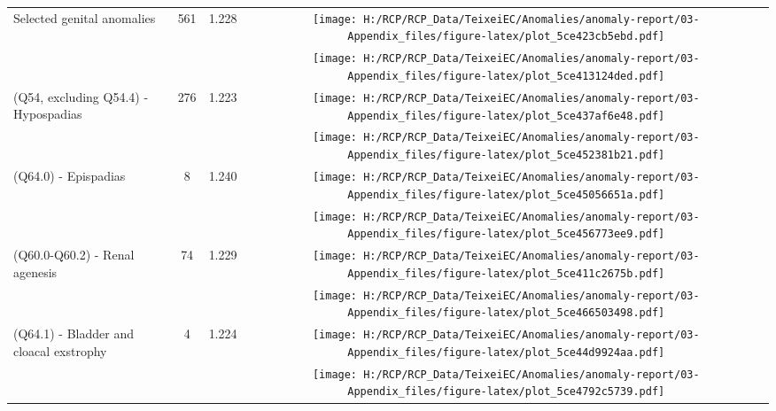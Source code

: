 \documentclass[
]{krantz}
\begin{document}
\begin{longtable}[t]{>{\raggedright\arraybackslash}m{4cm}cc>{}c}
Selected genital anomalies & 561 & 1.228 & \texttt{[image: H:/RCP/RCP\_Data/TeixeiEC/Anomalies/anomaly-report/03-Appendix\_files/figure-latex/plot\_5ce423cb5ebd.pdf]}\\
\addlinespace
\cellcolor{gray!6}{(Q53.1, Q53.2, Q53.9) - Cryptorchidism / undescended testicles} & \cellcolor{gray!6}{262} & \cellcolor{gray!6}{1.232} & \cellcolor{gray!6}{}\texttt{[image: H:/RCP/RCP\_Data/TeixeiEC/Anomalies/anomaly-report/03-Appendix\_files/figure-latex/plot\_5ce413124ded.pdf]}\\
(Q54, excluding Q54.4) - Hypospadias & 276 & 1.223 & \texttt{[image: H:/RCP/RCP\_Data/TeixeiEC/Anomalies/anomaly-report/03-Appendix\_files/figure-latex/plot\_5ce437af6e48.pdf]}\\
\cellcolor{gray!6}{(Q56) - Indeterminate sex} & \cellcolor{gray!6}{24} & \cellcolor{gray!6}{1.237} & \cellcolor{gray!6}{}\texttt{[image: H:/RCP/RCP\_Data/TeixeiEC/Anomalies/anomaly-report/03-Appendix\_files/figure-latex/plot\_5ce452381b21.pdf]}\\
(Q64.0) - Epispadias & 8 & 1.240 & \texttt{[image: H:/RCP/RCP\_Data/TeixeiEC/Anomalies/anomaly-report/03-Appendix\_files/figure-latex/plot\_5ce45056651a.pdf]}\\
\cellcolor{gray!6}{Selected urinary tract defects} & \cellcolor{gray!6}{163} & \cellcolor{gray!6}{1.228} & \cellcolor{gray!6}{}\texttt{[image: H:/RCP/RCP\_Data/TeixeiEC/Anomalies/anomaly-report/03-Appendix\_files/figure-latex/plot\_5ce456773ee9.pdf]}\\
\addlinespace
(Q60.0-Q60.2) - Renal agenesis & 74 & 1.229 & \texttt{[image: H:/RCP/RCP\_Data/TeixeiEC/Anomalies/anomaly-report/03-Appendix\_files/figure-latex/plot\_5ce411c2675b.pdf]}\\
\cellcolor{gray!6}{(Q61.1-Q61.5, Q61.8, Q61.9) - Cystic kidney} & \cellcolor{gray!6}{79} & \cellcolor{gray!6}{1.227} & \cellcolor{gray!6}{}\texttt{[image: H:/RCP/RCP\_Data/TeixeiEC/Anomalies/anomaly-report/03-Appendix\_files/figure-latex/plot\_5ce466503498.pdf]}\\
(Q64.1) - Bladder and cloacal exstrophy & 4 & 1.224 & \texttt{[image: H:/RCP/RCP\_Data/TeixeiEC/Anomalies/anomaly-report/03-Appendix\_files/figure-latex/plot\_5ce44d9924aa.pdf]}\\
\cellcolor{gray!6}{(Q64.2, Q64.3) - Lower urinary tract obstruction} & \cellcolor{gray!6}{20} & \cellcolor{gray!6}{1.222} & \cellcolor{gray!6}{}\texttt{[image: H:/RCP/RCP\_Data/TeixeiEC/Anomalies/anomaly-report/03-Appendix\_files/figure-latex/plot\_5ce4792c5739.pdf]}\\

\end{longtable}
\end{document}
